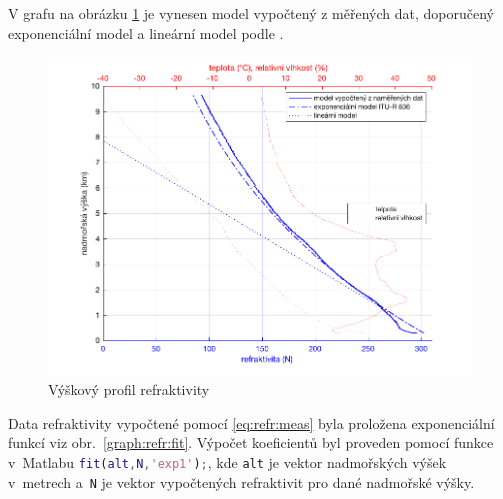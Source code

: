 \documentclass[twoside]{ctuthesis}
\theoremstyle{plain}
\theoremstyle{definition}
\theoremstyle{note}
\begin{document}
	V grafu na obrázku \ref{graph:refr} je vynesen model vypočtený z měřených dat, doporučený exponenciální model a lineární model podle \cite{zaklady:sireni:vln}.
	\begin{figure}[hbtp]
		\centering
		\includegraphics[width=.7\textwidth]{Graphs/refractivity_exp_lin_meas_hum.pdf}
		\caption{Výškový profil refraktivity}
		\label{graph:refr}
	\end{figure}

	Data refraktivity vypočtené pomocí \eqref{eq:refr:meas} byla proložena exponenciální funkcí viz obr.~\ref{graph:refr:fit}. Výpočet koeficientů byl proveden pomocí funkce v~Matlabu \lstinline[language=Matlab]|fit(alt,N,'exp1');|, kde \lstinline|alt| je vektor nadmořských výšek v~metrech a~\lstinline|N| je vektor vypočtených refraktivit pro dané nadmořské výšky.
\end{document}
